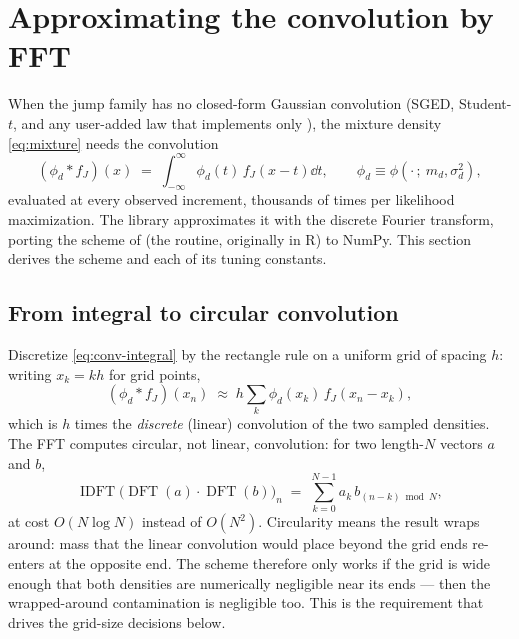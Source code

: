 \section{Approximating the convolution by FFT}
\label{sec:fft}

When the jump family has no closed-form Gaussian convolution (SGED,
Student-$t$, and any user-added law that implements only ), the
mixture density \eqref{eq:mixture} needs the convolution
\begin{equation}
  (\phi_d * f_J)(x)
  \;=\;
  \int_{-\infty}^{\infty} \phi_d(t)\, f_J(x - t) \dd t,
  \qquad
  \phi_d \equiv \phi(\cdot\,;\ m_d, \sigma_d^2),
  \label{eq:conv-integral}
\end{equation}
evaluated at every observed increment, thousands of times per likelihood
maximization. The library approximates it with the discrete Fourier
transform, porting the scheme of \citet[ch.~4]{Ospina2009} (the
 routine, originally in R) to NumPy. This section derives the
scheme and each of its tuning constants.

\subsection{From integral to circular convolution}

Discretize \eqref{eq:conv-integral} by the rectangle rule on a uniform
grid of spacing $h$: writing $x_k = k h$ for grid points,
\begin{equation}
  (\phi_d * f_J)(x_n)
  \;\approx\;
  h \sum_{k} \phi_d(x_k)\, f_J(x_n - x_k),
  \label{eq:riemann}
\end{equation}
which is $h$ times the \emph{discrete} (linear) convolution of the two
sampled densities. The FFT computes circular, not linear, convolution:
for two length-$N$ vectors $a$ and $b$,
\begin{equation}
  \operatorname{IDFT}\bigl( \operatorname{DFT}(a) \cdot \operatorname{DFT}(b) \bigr)_n
  \;=\;
  \sum_{k=0}^{N-1} a_k\, b_{(n - k) \bmod N},
  \label{eq:circular}
\end{equation}
at cost $O(N \log N)$ instead of $O(N^2)$. Circularity means the result
wraps around: mass that the linear convolution would place beyond the grid
ends re-enters at the opposite end. The scheme therefore only works if the
grid is wide enough that both densities are numerically negligible near
its ends --- then the wrapped-around contamination is negligible too. This
is the requirement that drives the grid-size decisions below.

